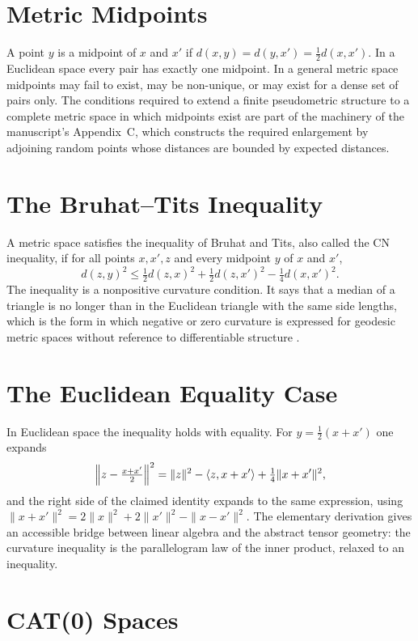 \documentclass[11pt,letterpaper]{report}
\theoremstyle{plain}
\theoremstyle{definition}
\theoremstyle{remark}
\begin{document}
\section{Metric Midpoints}

A point $y$ is a midpoint of $x$ and $x'$ if $d(x,y)=d(y,x')=\tfrac12d(x,x')$. In a Euclidean space every pair has exactly one midpoint. In a general metric space midpoints may fail to exist, may be non-unique, or may exist for a dense set of pairs only. The conditions required to extend a finite pseudometric structure to a complete metric space in which midpoints exist are part of the machinery of the manuscript's Appendix~C, which constructs the required enlargement by adjoining random points whose distances are bounded by expected distances.

\section{The Bruhat--Tits Inequality}

A metric space satisfies the inequality of Bruhat and Tits, also called the CN inequality, if for all points $x,x',z$ and every midpoint $y$ of $x$ and $x'$,
\[
d(z,y)^2\le\tfrac12d(z,x)^2+\tfrac12d(z,x')^2-\tfrac14d(x,x')^2.
\]
The inequality is a nonpositive curvature condition. It says that a median of a triangle is no longer than in the Euclidean triangle with the same side lengths, which is the form in which negative or zero curvature is expressed for geodesic metric spaces without reference to differentiable structure \cite{BruhatTits1972,BridsonHaefliger1999}.

\section{The Euclidean Equality Case}

In Euclidean space the inequality holds with equality. For $y=\tfrac12(x+x')$ one expands
\[
\Bigl\|z-\tfrac{x+x'}2\Bigr\|^2=\|z\|^2-\langle z,x+x'\rangle+\tfrac14\|x+x'\|^2,
\]
and the right side of the claimed identity expands to the same expression, using $\|x+x'\|^2=2\|x\|^2+2\|x'\|^2-\|x-x'\|^2$. The elementary derivation gives an accessible bridge between linear algebra and the abstract tensor geometry: the curvature inequality is the parallelogram law of the inner product, relaxed to an inequality.

\section{CAT(0) Spaces}
\end{document}
